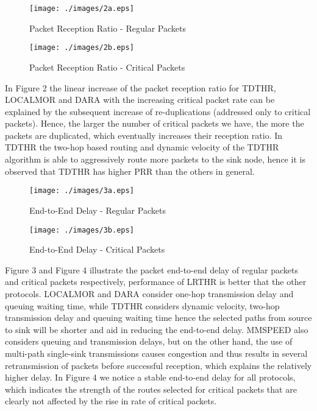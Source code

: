 \documentclass[fleqn,twoside]{article}
\begin{document}
\begin{figure}
\centering
\texttt{[image: ./images/2a.eps]}
\caption{Packet Reception Ratio - Regular Packets}
\end{figure}

\begin{figure}
\centering
\texttt{[image: ./images/2b.eps]}
\caption{Packet Reception Ratio - Critical Packets}
\end{figure}
\vskip 2mm
In Figure 2 the linear increase of the
packet reception ratio for TDTHR, LOCALMOR and DARA with the
increasing critical packet rate can be explained by the
subsequent increase of re-duplications (addressed only to critical
packets). Hence, the larger the number of critical
packets we have, the more the packets are duplicated,
which eventually increases their reception ratio.
In TDTHR the two-hop based routing and dynamic velocity of the TDTHR algorithm is able to aggressively route more packets
to the sink node, hence it is observed that TDTHR has higher PRR than the others in general.


\begin{figure}
\centering
\texttt{[image: ./images/3a.eps]}
\caption{End-to-End Delay - Regular Packets}
\end{figure}

\begin{figure}
\centering
\texttt{[image: ./images/3b.eps]}
\caption{End-to-End Delay - Critical Packets}
\end{figure}
\vskip 2mm
Figure 3 and Figure 4 illustrate the packet end-to-end delay of regular packets and critical packets respectively, performance 
of LRTHR is better that the other protocols.
LOCALMOR and DARA consider one-hop transmission delay and queuing waiting time, while TDTHR considers
dynamic velocity, two-hop transmission delay and queuing waiting time hence the selected paths from 
source to sink will be shorter and aid in reducing the end-to-end delay.
MMSPEED also considers queuing and transmission delays, but on the other hand, the use of multi-path single-sink 
transmissions causes congestion and thus results in several retransmission of packets before successful reception, which 
explains the relatively higher delay. In Figure 4 we notice a stable end-to-end delay for all protocols, which indicates
the strength of the routes selected for critical packets that are clearly not affected by the rise in rate of critical packets.
\end{document}
